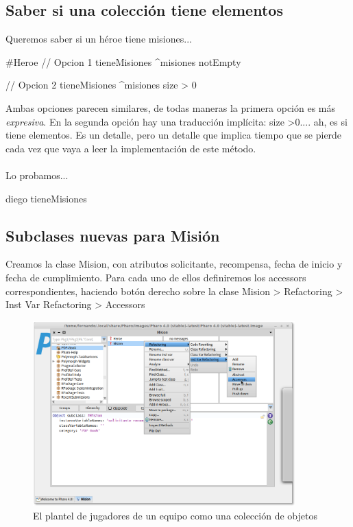 \documentclass[a4paper,12pt]{book}
\begin{document}
\subsection{Saber si una colección tiene elementos}
Queremos saber si un héroe tiene misiones...

\begin{code}
#Heroe
// Opcion 1
tieneMisiones
    ^misiones notEmpty
\end{code}

    
\begin{code}
// Opcion 2
tieneMisiones
    ^misiones size > 0
\end{code}

Ambas opciones parecen similares, de todas maneras la primera opción es más \textit{expresiva}. En la segunda
opción hay una traducción implícita: size \textgreater  0.... ah, es si tiene elementos. Es un detalle, 
pero un detalle que implica tiempo que se pierde cada vez que vaya a leer la implementación de este método.
\\
\\
Lo probamos...

\begin{code}
diego tieneMisiones
\end{code}

\subsection{Subclases nuevas para Misión}
Creamos la clase Mision, con atributos solicitante, recompensa, fecha de inicio y fecha de cumplimiento. 
Para cada uno de ellos definiremos los accessors correspondientes, haciendo botón derecho sobre la clase
Mision > Refactoring > Inst Var Refactoring > Accessors 


\begin{figure}[h!]
    \centering
    \includegraphics[width=0.9\textwidth]{images/10_accessors.png}
    \caption{El plantel de jugadores de un equipo como una colección de objetos}
\end{figure}
\end{document}
